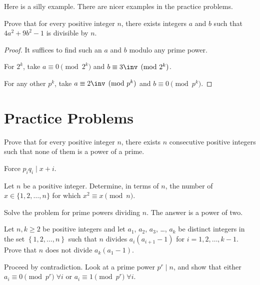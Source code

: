 \documentclass[11pt]{scrartcl}
\begin{document}
Here is a silly example. There are nicer examples in the practice problems.
\begin{example}
  Prove that for every positive integer $n$,
  there exists integers $a$ and $b$ such that $4a^2+9b^2-1$ is divisible by $n$.
\end{example}
\begin{proof}
  It suffices to find such an $a$ and $b$ modulo any prime power.

  For $2^k$, take $a \equiv 0 \pmod{2^k}$ and $b \equiv 3\inv \pmod{2^k}$.

  For any other $p^k$, take $a \equiv 2\inv \pmod{p^k}$ and $b \equiv 0 \pmod{p^k}$.
\end{proof}

\newpage

\section{Practice Problems}

\begin{problem}
  [IMO 1989] Prove that for every positive integer $n$,
  there exists $n$ consecutive positive integers such that
  none of them is a power of a prime.
  \begin{hint}
    Force $p_i q_i \mid x + i$.
  \end{hint}
\end{problem}

\begin{problem}
  Let $n$ be a positive integer.
  Determine, in terms of $n$, the number of $x \in \{1,2,\dots,n\}$
  for which $x^2 \equiv x \pmod n$.
  \begin{hint}
    Solve the problem for prime powers dividing $n$.
    The answer is a power of two.
  \end{hint}
\end{problem}

\begin{problem}
  [IMO 2009/1]
  Let $n, k \ge 2$ be positive integers and let $a_1$, $a_2$, $a_3$, \dots, $a_k$
  be distinct integers in the set $\left\{ 1,2,\dots,n \right\}$
  such that $n$ divides $a_i(a_{i+1} - 1)$ for $i = 1,2,\dots,k-1$.
  Prove that $n$ does not divide $a_k(a_1 - 1)$.
  \begin{hint}
    Proceed by contradiction.
    Look at a prime power $p^r \mid n$,
    and show that either $a_i \equiv 0 \pmod{p^r} \; \forall i$ or $a_i \equiv 1 \pmod{p^r} \; \forall i$.
  \end{hint}
\end{problem}
\end{document}
